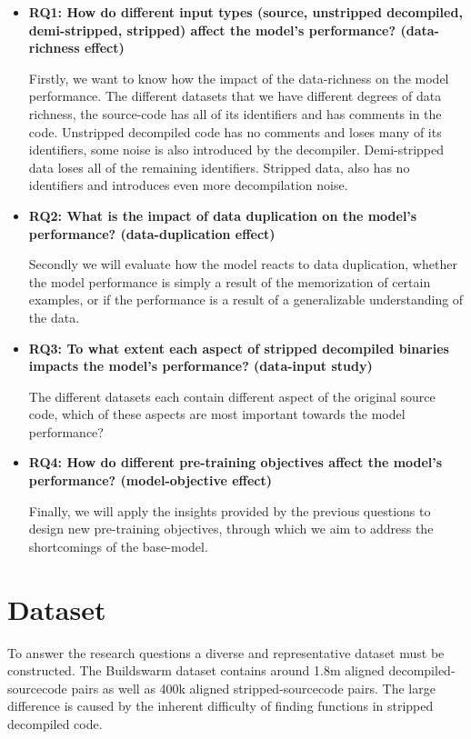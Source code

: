 \begin{itemize}
    \item \textbf{RQ1: How do different input types (source, unstripped decompiled, demi-stripped, stripped) affect the model's performance? (data-richness effect)}
    \begin{sloppypar}
    Firstly, we want to know how the impact of the data-richness on the model performance. The different datasets that we have different degrees of data richness, the source-code has all of its identifiers and has comments in the code. Unstripped decompiled code has no comments and loses many of its identifiers, some noise is also introduced by the decompiler. Demi-stripped data loses all of the remaining identifiers. Stripped data, also has no identifiers and introduces even more decompilation noise.
    \end{sloppypar}
    \item \textbf{RQ2: What is the impact of data duplication on the model's performance? (data-duplication effect)}
    \begin{sloppypar}
    Secondly we will evaluate how the model reacts to data duplication, whether the model performance is simply a result of the memorization of certain examples, or if the performance is a result of a generalizable understanding of the data.
    \end{sloppypar}
    \item \textbf{RQ3: To what extent each aspect of stripped decompiled binaries impacts the model's performance? (data-input study)}
    \begin{sloppypar}
    The different datasets each contain different aspect of the original source code, which of these aspects are most important towards the model performance? 
    \end{sloppypar}
    \item \textbf{RQ4: How do different pre-training objectives affect the model's performance? (model-objective effect)}
    \begin{sloppypar}
    Finally, we will apply the insights provided by the previous questions to design new pre-training objectives, through which we aim to address the shortcomings of the base-model. 
    \end{sloppypar}
\end{itemize}

\section{Dataset}
To answer the research questions a diverse and representative dataset must be constructed. The Buildswarm dataset contains around 1.8m aligned decompiled-sourcecode pairs as well as 400k aligned stripped-sourcecode pairs. The large difference is caused by the inherent difficulty of finding functions in stripped decompiled code. 

